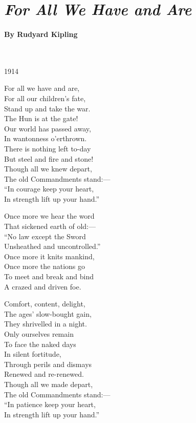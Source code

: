 \documentclass[11pt, letterpaper]{memoir}
\begin{document}
{	\newpage
	\pagestyle{empty}
	\addtocounter{page}{-1}
\section*{\emph{For All We Have and Are}}
\paragraph{By Rudyard Kipling}~

\vspace{1em}
\begin{minipage}[t]{0.49\linewidth}
	{\large \hspace{2em}1914}
	
	For all we have and are,\\
	For all our children's fate,\\
	Stand up and take the war.\\
	The Hun is at the gate!\\
	Our world has passed away,\\
	In wantonness o'erthrown.\\
	There is nothing left to-day\\
	But steel and fire and stone!\\
	Though all we knew depart,\\
	The old Commandments stand:—\\
	“In courage keep your heart,\\
	In strength lift up your hand.”
	
	Once more we hear the word\\
	That sickened earth of old:—\\
	“No law except the Sword\\
	Unsheathed and uncontrolled.”\\
	Once more it knits mankind,\\
	Once more the nations go\\
	To meet and break and bind\\
	A crazed and driven foe.	
\end{minipage}
\begin{minipage}[t]{0.49\linewidth}
	Comfort, content, delight,\\
	The ages' slow-bought gain,\\
	They shrivelled in a night.\\
	Only ourselves remain\\
	To face the naked days\\
	In silent fortitude,\\
	Through perils and dismays\\
	Renewed and re-renewed.\\
	Though all we made depart,\\
	The old Commandments stand:—\\
	“In patience keep your heart,\\
	In strength lift up your hand.”
	

\end{minipage}}
\end{document}
